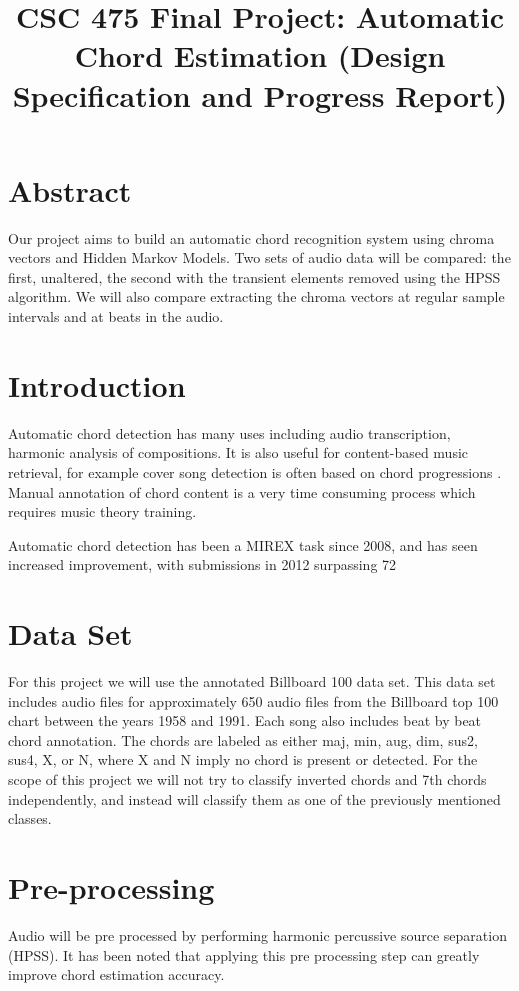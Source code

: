 \documentclass{article}
\title{CSC 475 Final Project: Automatic Chord Estimation (Design Specification and Progress Report)}
\begin{document}
%
\maketitle
%


\section{Abstract}\label{sec:desoutline}
Our project aims to build an automatic chord recognition system using chroma
vectors and Hidden Markov Models. Two sets of audio data will be compared: the
first, unaltered, the second with the transient elements removed using the HPSS
algorithm. We will also compare extracting the chroma vectors at regular sample
intervals and at beats in the audio.

\section{Introduction}\label{sec:intro}

Automatic chord detection has many uses including audio transcription, harmonic
analysis of compositions. It is also useful for content-based music retrieval,
for example cover song detection is often based on chord progressions
\cite{Papadopoulos:18}.  Manual annotation of chord content is a very time
consuming process which requires music theory training. 

Automatic chord detection has been a MIREX task since 2008, and has seen increased
improvement, with submissions in 2012 surpassing 72%

\section{Data Set}

For this project we will use the annotated Billboard 100 data set. This data
set includes audio files for approximately 650 audio files from the Billboard
top 100 chart between the years 1958 and 1991. Each song also includes beat by
beat chord annotation\cite{Burgoyne:07}. The chords are labeled as either maj,
min, aug, dim, sus2, sus4, X, or N, where X and N imply no chord is present or
detected.  For the scope of this project we will not try to classify inverted
chords and 7th chords independently, and instead will classify them as one of
the previously mentioned classes.

\section{Pre-processing}
Audio will be pre processed by performing harmonic percussive source separation
(HPSS). It has been noted that applying this pre processing step can greatly
improve chord estimation accuracy\cite{Reed:09}.
\end{document}
